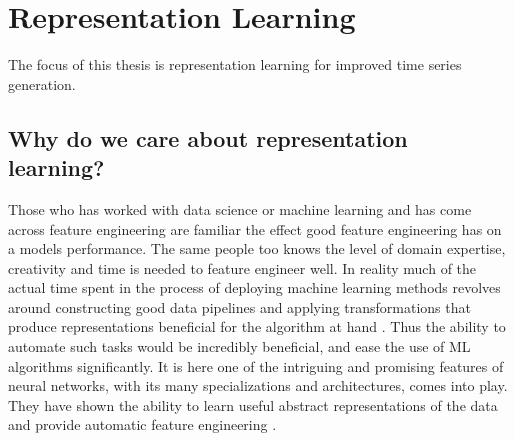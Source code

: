 \documentclass[../../thesis.tex]{subfiles}
\begin{document}









\section{Representation Learning}

The focus of this thesis is representation learning for improved time series generation.

\subsection{Why do we care about representation learning?}
Those who has worked with data science or machine learning and has come across feature engineering are familiar the effect good feature engineering has on a models performance. The same people too knows the level of domain expertise, creativity and time is needed to feature engineer well. In reality much of the actual time spent in the process of deploying machine learning methods revolves around constructing good data pipelines and applying transformations that produce representations beneficial for the algorithm at hand \cite{Rep-rev-persp}. Thus the ability to automate such tasks would be incredibly beneficial, and ease the use of ML algorithms significantly. It is here one of the intriguing and promising features of neural networks, with its many specializations and architectures, comes into play. They have shown the ability to learn useful abstract representations of the data and provide automatic feature engineering \cite{Rep-rev-persp}. 
\end{document}
